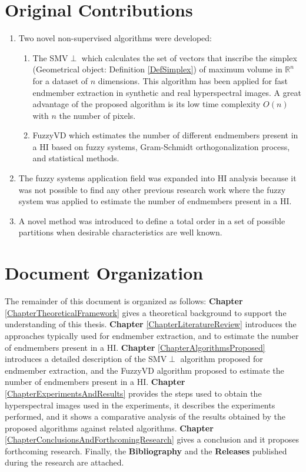 \documentclass[11pt, oneside]{Thesis} %
\begin{document}
\section{Original Contributions}

\begin{enumerate}
	\item Two novel non-supervised algorithms were developed:
		\begin{enumerate}
			\item The SMV$\perp$ which calculates the set of vectors that inscribe 
			      the simplex (Geometrical object: Definition \ref{DefSimplex}) of 
			      maximum volume in $\mathbb{R}^n$ for a dataset 
			      of $n$ dimensions. This algorithm has been applied for fast 
			      endmember extraction in synthetic and real hyperspectral images. 
			      A great advantage of the proposed algorithm is its low time 
			      complexity $O(n)$ with $n$ the number of pixels.
			\item FuzzyVD which estimates the number of different endmembers present 
			      in a HI based on fuzzy systems, Gram-Schmidt orthogonalization 
			      process, and statistical methods.
		\end{enumerate}
	\item The fuzzy systems application field was expanded into HI analysis because 
	      it was not possible to find any other previous research work where the fuzzy 
	      system was applied to estimate the number of endmembers present in a HI.
	\item A novel method was introduced to define a total order in a set of possible 
	      partitions when desirable characteristics are well known.
\end{enumerate}






\section{Document Organization}

The remainder of this document is organized as follows: 
\textbf{Chapter} \ref{ChapterTheoreticalFramework} gives a theoretical background 
to support the understanding of this thesis. \textbf{Chapter} 
\ref{ChapterLiteratureReview} introduces the approaches typically used for 
endmember extraction, and to estimate the number of endmembers present in a HI. 
\textbf{Chapter} \ref{ChapterAlgorithmsProposed} 
introduces a detailed description of the SMV$\perp$ algorithm proposed for endmember 
extraction, and the FuzzyVD algorithm proposed to estimate the number of endmembers 
present in a HI. \textbf{Chapter} \ref{ChapterExperimentsAndResults} provides the 
steps used to obtain the hyperspectral images used in the experiments, it describes 
the experiments performed, and it shows a comparative analysis of the results 
obtained by the proposed algorithms against related algorithms. \textbf{Chapter} 
\ref{ChapterConclusionsAndForthcomingResearch} gives a conclusion and it proposes 
forthcoming research. Finally, the \textbf{Bibliography} and the \textbf{Releases} 
published during the research are attached.
\end{document}

